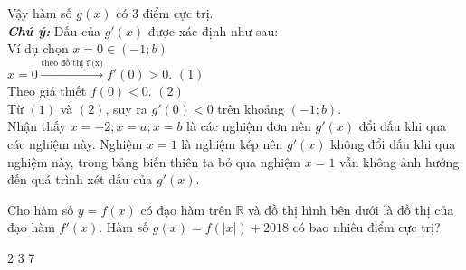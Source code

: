 \begin{ex}
{\begin{center}
		\end{center}
		Vậy hàm số $g(x)$ có $3$ điểm cực trị.\\
		\textit{\textbf{Chú ý: }}Dấu của $g'(x)$ được xác định như sau: \\
Ví dụ chọn $x=0\in (-1;b)$ \\
		$x=0\xrightarrow{\text{theo đồ thị f'(x)}}f'(0)>0$. $(1)$ \\
		Theo giả thiết $f(0)<0$. $(2)$ \\
		Từ $(1)$ và $(2)$, suy ra $g'(0)<0$ trên khoảng $(-1;b)$. \\
		Nhận thấy $x=-2; x=a; x=b$ là các nghiệm đơn nên $g'(x)$ đổi dấu khi qua các nghiệm này. Nghiệm $x=1$ là nghiệm kép nên $g'(x)$ không đổi dấu khi qua nghiệm này, trong bảng biến thiên ta bỏ qua nghiệm $x=1$ vẫn không ảnh hưởng đến quá trình xét dấu của $g'(x)$.}
\end{ex}
\begin{ex}%
[2D1G5-5]
Cho hàm số $y=f(x)$ có đạo hàm trên $\mathbb{R}$ và đồ thị hình bên dưới là đồ thị của đạo hàm $f'(x)$. Hàm số $g(x)=f\left(|x|\right)+2018$ có bao nhiêu điểm cực trị?
\begin{center}
\end{center}
	\choice
	{2}
	{3}
	{}
	{7}
\end{ex}
